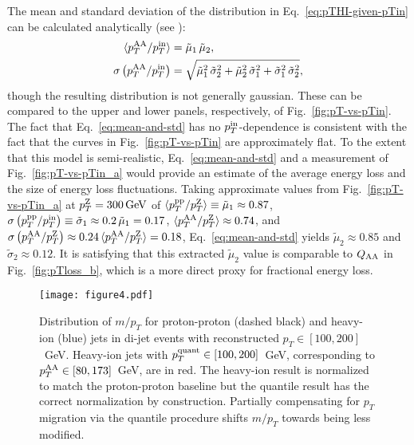 \documentclass[aps,prl,twocolumn,preprintnumbers,superscriptaddress,showpacs,floatfix, nofootinbib]{revtex4-1}
\newcommand{\pTZ}{p_T^{\rm Z}}
\newcommand{\pTin}{p_T^{\rm in}}
\newcommand{\pTHI}{p_T^{\rm AA}}
\newcommand{\pTvac}{p_T^{\rm pp}}
\newcommand{\pTq}{p_T^{\rm quant}}
\newcommand{\Eq}[1]{Eq.~\eqref{#1}}
\newcommand{\Fig}[1]{Fig.~\ref{#1}}
\begin{document}
The mean and standard deviation of the distribution in \Eq{eq:pTHI-given-pTin} can be calculated analytically (see \cite{Bishop:2006:PRM:1162264}): 
%
\begin{align}
\begin{split}
	\label{eq:mean-and-std}
	\langle \pTHI/ \pTin \rangle &= \tilde{\mu}_1 \, \tilde{\mu}_2,\\
	\sigma \left( \pTHI/ \pTin \right) &= \sqrt{ \tilde{\mu}_1^2 \, \tilde{\sigma}_2^2 + \tilde{\mu}_2^2 \, \tilde{\sigma}_1^2 + \tilde{\sigma}_1^2 \, \tilde{\sigma}_2^2},
	\end{split}
\end{align}
%
though the resulting distribution is not generally gaussian.
%
These can be compared to the upper and lower panels, respectively, of \Fig{fig:pT-vs-pTin}.
%
The fact that \Eq{eq:mean-and-std} has no $\pTin$-dependence is consistent with the fact that the curves in \Fig{fig:pT-vs-pTin} are approximately flat.
%
To the extent that this model is semi-realistic, \Eq{eq:mean-and-std} and a measurement of \Fig{fig:pT-vs-pTin_a} would provide an estimate of the average energy loss and the size of energy loss fluctuations.
%
Taking approximate values from \Fig{fig:pT-vs-pTin_a} at $\pTZ = \SI{300}{GeV}$ of $\langle \pTvac/ \pTZ \rangle \equiv \tilde{\mu}_1 \approx 0.87$, $\sigma \left( \pTvac/\pTin \right) \equiv \tilde{\sigma}_1 \approx 0.2\,\tilde{\mu}_1 = 0.17$, $\langle \pTHI/ \pTZ \rangle \approx 0.74$, and $\sigma \left( \pTHI/ \pTZ \right) \approx 0.24 \, \langle \pTHI/ \pTZ \rangle = 0.18$, \Eq{eq:mean-and-std} yields $\tilde{\mu}_2 \approx 0.85$ and $\tilde{\sigma}_2 \approx 0.12$.
%
It is satisfying that this extracted $\tilde{\mu}_2$ value is comparable to $Q_{\rm AA}$ in \Fig{fig:pTloss_b}, which is a more direct proxy for fractional energy loss.


\begin{figure}[t]
\texttt{[image: figure4.pdf]}
\captionsetup{font=small,justification=raggedright}
\caption{\label{fig:moverpT} Distribution of $m/p_T$ for proton-proton (dashed black) and heavy-ion (blue) jets in di-jet events with reconstructed $p_T \in [100,200]$~GeV. Heavy-ion jets with $\pTq \in [100,200]$~GeV, corresponding to $\pTHI \in [80,173]$~GeV, are in red.
%
The heavy-ion result is normalized to match the proton-proton baseline but the quantile result has the correct normalization by construction.
%
Partially compensating for $p_T$ migration via the quantile procedure shifts $m/p_T$ towards being less modified.}
\end{figure}
\end{document}
